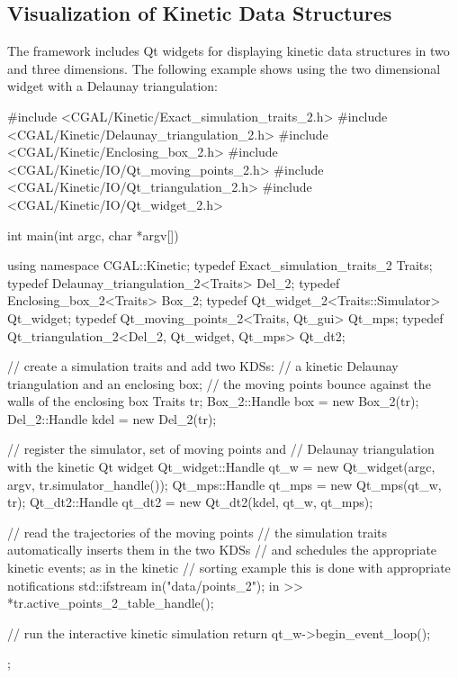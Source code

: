 

\subsection{Visualization of Kinetic Data Structures}
\label{sec:delaunay_2_example}

The framework includes Qt widgets for displaying kinetic data
structures in two and three dimensions. The following example shows
using the two dimensional widget with a Delaunay triangulation:

\begin{ccExampleCode}
#include <CGAL/Kinetic/Exact_simulation_traits_2.h>
#include <CGAL/Kinetic/Delaunay_triangulation_2.h>
#include <CGAL/Kinetic/Enclosing_box_2.h>
#include <CGAL/Kinetic/IO/Qt_moving_points_2.h>
#include <CGAL/Kinetic/IO/Qt_triangulation_2.h>
#include <CGAL/Kinetic/IO/Qt_widget_2.h>

int main(int argc, char *argv[]) {
    using namespace CGAL::Kinetic;
    typedef Exact_simulation_traits_2 Traits;
    typedef Delaunay_triangulation_2<Traits> Del_2;
    typedef Enclosing_box_2<Traits> Box_2;
    typedef Qt_widget_2<Traits::Simulator> Qt_widget;
    typedef Qt_moving_points_2<Traits, Qt_gui> Qt_mps;
    typedef Qt_triangulation_2<Del_2, Qt_widget, Qt_mps> Qt_dt2;
    
    // create a simulation traits and add two KDSs:
    // a kinetic Delaunay triangulation and an enclosing box;
    // the moving points bounce against the walls of the enclosing box
    Traits tr;
    Box_2::Handle box = new Box_2(tr);
    Del_2::Handle kdel = new Del_2(tr);

    // register the simulator, set of moving points and
    // Delaunay triangulation with the kinetic Qt widget
    Qt_widget::Handle qt_w = new Qt_widget(argc, argv, tr.simulator_handle());
    Qt_mps::Handle qt_mps = new Qt_mps(qt_w, tr);
    Qt_dt2::Handle qt_dt2 = new Qt_dt2(kdel, qt_w, qt_mps);

    // read the trajectories of the moving points
    //  the simulation traits automatically inserts them in the two KDSs
    // and schedules the appropriate kinetic events; as in the kinetic
    // sorting example this is done with appropriate notifications
    std::ifstream in("data/points_2");    
    in  >> *tr.active_points_2_table_handle();

    // run the interactive kinetic simulation
    return qt_w->begin_event_loop();
};
\end{ccExampleCode}

